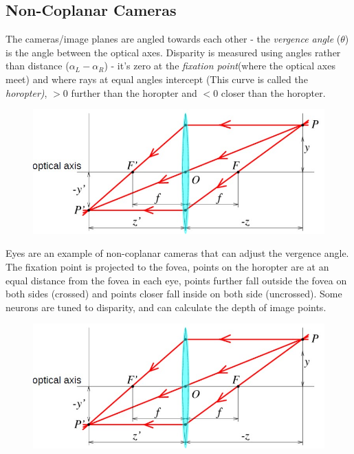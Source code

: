 \subsection{Non-Coplanar Cameras}
The cameras/image planes are angled towards each other - the \emph{vergence angle} ($\theta$) is the angle between the optical axes. Disparity is measured using angles rather than distance ($\alpha_L - \alpha_R$) - it's zero at the \emph{fixation point}(where the optical axes meet) and where rays at equal angles intercept (This curve is called the \emph{horopter)}, $>0$ further than the horopter and $<0$ closer than the horopter. 
\begin{figure}[H]
    \centering
    \includegraphics[width = \textwidth]{Images/Thin_Lens_Diagram} %
\end{figure}

Eyes are an example of non-coplanar cameras that can adjust the vergence angle. The fixation point is projected to the fovea, points on the horopter are at an equal distance from the fovea in each eye, points further fall outside the fovea on both sides (crossed) and points closer fall inside on both side (uncrossed). Some neurons are tuned to disparity, and can calculate the depth of image points. 
\begin{figure}[H]
    \centering
    \includegraphics[width = \textwidth]{Images/Thin_Lens_Diagram} %
\end{figure}

